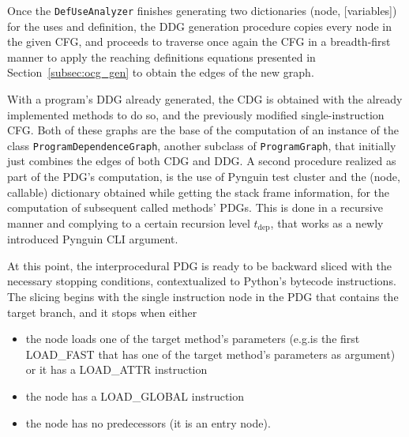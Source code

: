\documentclass[%
  chapterprefix=false,%
  open=right,%
  twoside=true,%
  paper=a4,%
  logofile={Figures/logo.png},%
  thesistype=master,%
  UKenglish,%
]{se2thesis}
\newcommand{\classname}[1]{\texttt{#1}}
\begin{document}

Once the \classname{DefUseAnalyzer} finishes generating two dictionaries (node, [variables]) for the uses and definition, the DDG generation procedure copies every node in the given CFG, and proceeds to traverse once again the CFG in a breadth-first manner to apply the reaching definitions equations presented in Section~\ref{subsec:ocg_gen} to obtain the edges of the new graph.

With a program's DDG already generated, the CDG is obtained with the already implemented methods to do so, and the previously modified single-instruction CFG.\@
Both of these graphs are the base of the computation of an instance of the class \classname{ProgramDependenceGraph}, another subclass of \classname{ProgramGraph}, that initially just combines the edges of both CDG and DDG.\@
A second procedure realized as part of the PDG's computation, is the use of Pynguin test cluster and the (node, callable) dictionary obtained while getting the stack frame information, for the computation of subsequent called methods' PDGs.
This is done in a recursive manner and complying to a certain recursion level \(t_{\text{dep}}\), that works as a newly introduced Pynguin CLI argument. 

At this point, the interprocedural PDG is ready to be backward sliced with the necessary stopping conditions, contextualized to Python's bytecode instructions.
The slicing begins with the single instruction node in the PDG that contains the target branch, and it stops when either

\begin{itemize}
  \item the node loads one of the target method's parameters (e.g.\@it is the first LOAD\_FAST that has one of the target method's parameters as argument) or it has a LOAD\_ATTR instruction
  \item the node has a LOAD\_GLOBAL instruction
  \item the node has no predecessors (it is an entry node).
\end{itemize}
\end{document}
